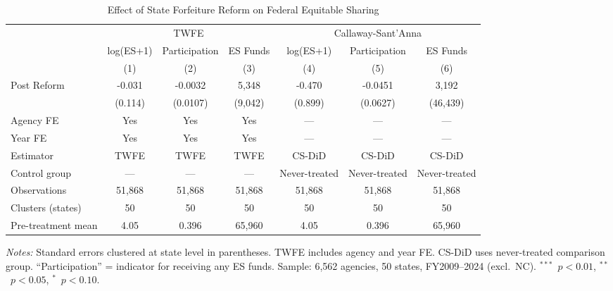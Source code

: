 \begin{table}[!htbp]
\centering
\begin{threeparttable}
\caption{Effect of State Forfeiture Reform on Federal Equitable Sharing}
\label{tab:main}
\begin{adjustbox}{max width=\textwidth}
\begin{tabular}{@{}lcccccc@{}}
\toprule
 & \multicolumn{3}{c}{TWFE} & \multicolumn{3}{c}{Callaway-Sant'Anna} \\
\cmidrule(lr){2-4} \cmidrule(lr){5-7}
 & log(ES+1) & Participation & ES Funds & log(ES+1) & Participation & ES Funds \\
 & (1) & (2) & (3) & (4) & (5) & (6) \\
\midrule
Post Reform & -0.031 & -0.0032 & 5,348 & -0.470 & -0.0451 & 3,192 \\
 & (0.114) & (0.0107) & (9,042) & (0.899) & (0.0627) & (46,439) \\
\midrule
Agency FE & Yes & Yes & Yes & --- & --- & --- \\
Year FE & Yes & Yes & Yes & --- & --- & --- \\
Estimator & TWFE & TWFE & TWFE & CS-DiD & CS-DiD & CS-DiD \\
Control group & --- & --- & --- & Never-treated & Never-treated & Never-treated \\
Observations & 51,868 & 51,868 & 51,868 & 51,868 & 51,868 & 51,868 \\
Clusters (states) & 50 & 50 & 50 & 50 & 50 & 50 \\
Pre-treatment mean & 4.05 & 0.396 & 65,960 & 4.05 & 0.396 & 65,960 \\
\bottomrule
\end{tabular}
\end{adjustbox}
\begin{tablenotes}[flushleft]\footnotesize
\item \textit{Notes:} Standard errors clustered at state level in parentheses. TWFE includes agency and year FE. CS-DiD uses never-treated comparison group. ``Participation'' = indicator for receiving any ES funds. Sample: 6,562 agencies, 50 states, FY2009--2024 (excl.\ NC). $^{***}$~$p<0.01$, $^{**}$~$p<0.05$, $^{*}$~$p<0.10$.
\end{tablenotes}
\end{threeparttable}
\end{table}

